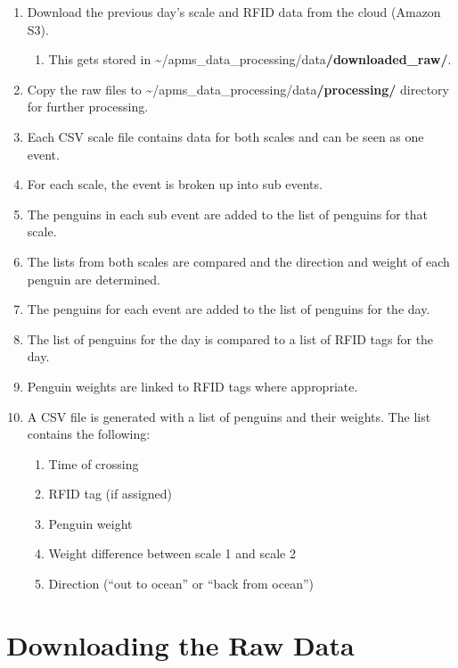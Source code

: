 \documentclass[
  letterpaper,
]{scrbook}
\providecommand{\tightlist}{%
  \setlength{\itemsep}{0pt}\setlength{\parskip}{0pt}}
\begin{document}
\begin{enumerate}
\def\labelenumi{\arabic{enumi}.}
\item
  Download the previous day's scale and RFID data from the cloud (Amazon
  S3).

  \begin{enumerate}
  \def\labelenumii{\alph{enumii}.}
  \tightlist
  \item
    This gets stored in
    \textasciitilde/apms\_data\_processing/data\textbf{/downloaded\_raw/}.
  \end{enumerate}
\item
  Copy the raw files to
  \textasciitilde/apms\_data\_processing/data\textbf{/processing/}
  directory for further processing.
\item
  Each CSV scale file contains data for both scales and can be seen as
  one event.
\item
  For each scale, the event is broken up into sub events.
\item
  The penguins in each sub event are added to the list of penguins for
  that scale.
\item
  The lists from both scales are compared and the direction and weight
  of each penguin are determined.
\item
  The penguins for each event are added to the list of penguins for the
  day.
\item
  The list of penguins for the day is compared to a list of RFID tags
  for the day.
\item
  Penguin weights are linked to RFID tags where appropriate.
\item
  A CSV file is generated with a list of penguins and their weights. The
  list contains the following:

  \begin{enumerate}
  \def\labelenumii{\alph{enumii}.}
  \item
    Time of crossing
  \item
    RFID tag (if assigned)
  \item
    Penguin weight
  \item
    Weight difference between scale 1 and scale 2
  \item
    Direction (``out to ocean'' or ``back from ocean'')
  \end{enumerate}
\end{enumerate}

\section{Downloading the Raw Data}\label{downloading-the-raw-data}
\end{document}
